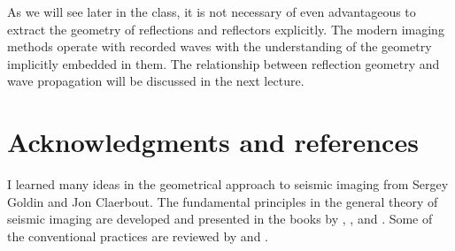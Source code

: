\documentclass[12pt]{handout}
\begin{document}
As we will see later in the class, it is not necessary of even advantageous to
extract the geometry of reflections and reflectors explicitly. The modern
imaging methods operate with recorded waves with the understanding of the
geometry implicitly embedded in them. The relationship between reflection
geometry and wave propagation will be discussed in the next lecture.

\section{Acknowledgments and references}

I learned many ideas in the geometrical approach to
seismic imaging from Sergey Goldin and Jon Claerbout. The fundamental
principles in the general theory of seismic imaging are developed and
presented in the books by \cite{fgdp,iei}, \cite{berkhout}, and
\cite{stolt}. Some of the conventional practices are reviewed by
\cite{scales} and \cite{IG202-00-10012027}.



\end{document}
